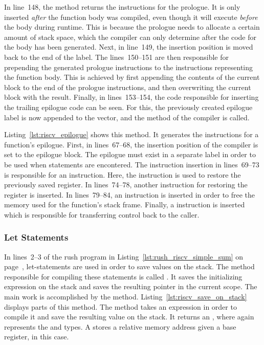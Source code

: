 In line~148, the  method returns the instructions for the prologue.
It is only inserted \emph{after} the function body was compiled, even though it will execute \emph{before} the body during runtime.
This is because the prologue needs to allocate a certain amount of stack space, which the compiler can only determine after the code for the body has been generated.
Next, in line~149, the insertion position is moved back to the end of the  label.
The lines~150--151 are then responsible for prepending the generated prologue instructions to the instructions representing the function body.
This is achieved by first appending the contents of the current block to the end of the prologue instructions, and then overwriting the current block with the result.
Finally, in lines~153--154, the code responsible for inserting the trailing epilogue code can be seen.
For this, the previously created epilogue label is now appended to the  vector, and the  method of the compiler is called.


Listing~\ref{lst:riscv_epilogue} shows this  method.
It generates the instructions for a function's epilogue.
First, in lines~67--68, the insertion position of the compiler is set to the epilogue block.
The epilogue must exist in a separate label in order to be used when  statements are encontered.
The instruction insertion in lines~69--73 is responsible for an  instruction.
Here, the  instruction is used to restore the previously saved  register.
In lines~74--78, another  instruction for restoring the  register is inserted.
In lines~79--84, an  instruction is inserted in order to free the memory used for the function's stack frame.
Finally, a  instruction is inserted which is responsible for transferring control back to the caller.

\subsubsection{Let Statements}

In lines~2--3 of the rush program in Listing~\ref{lst:rush_riscv_simple_sum} on page~\pageref{lst:rush_riscv_simple_sum}, let-statements are used in order to save values on the stack.
The method responsible for compiling these statements is called .
It saves the initializing expression on the stack and saves the resulting pointer in the current scope.
The main work is accomplished by the  method.
Listing~\ref{lst:riscv_save_on_stack} displays parts of this method.
The method takes an expression in order to compile it and save the resulting value on the stack.
It returns an , where  again represents the \qVerb{!} and \qVerb{()} types.
A  stores a relative memory address given a base register,  in this case.


